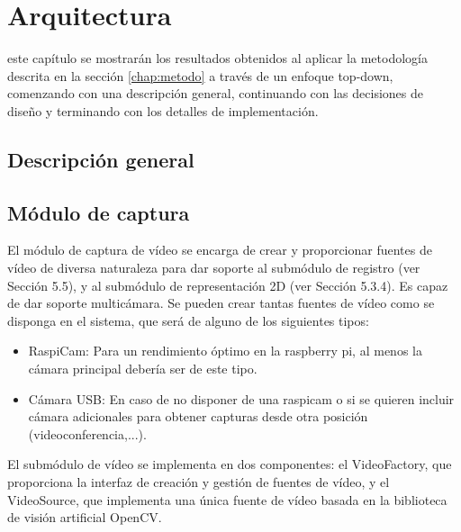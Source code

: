 \chapter{Arquitectura}
\label{chap:arquitectura}
 este capítulo se mostrarán los resultados obtenidos al aplicar la metodología descrita en la sección \ref{chap:metodo} a través de un enfoque top-down, comenzando con una descripción general, continuando con las decisiones
de diseño y terminando con los detalles de implementación. 

\section{Descripción general}


\section{Módulo de captura}
El módulo de captura de vídeo se encarga de crear y proporcionar fuentes de vídeo de diversa naturaleza para dar soporte al submódulo de registro (ver Sección 5.5), y al submódulo de representación 2D (ver Sección 5.3.4).
Es capaz de dar soporte multicámara. Se pueden crear tantas fuentes de vídeo como se disponga en el sistema, que será de alguno de los siguientes tipos: 
\begin{itemize}
\item RaspiCam: Para un rendimiento óptimo en la raspberry pi, al menos la cámara principal debería ser de este tipo.
\item Cámara USB: En caso de no disponer de una raspicam o si se quieren incluir cámara adicionales para obtener capturas desde otra posición (videoconferencia,...).
\end{itemize}

El submódulo de vídeo se implementa en dos componentes: el VideoFactory, que proporciona la interfaz de creación y gestión de fuentes de vídeo, y el VideoSource, que implementa una única fuente de vídeo basada en la biblioteca de visión artificial OpenCV.

